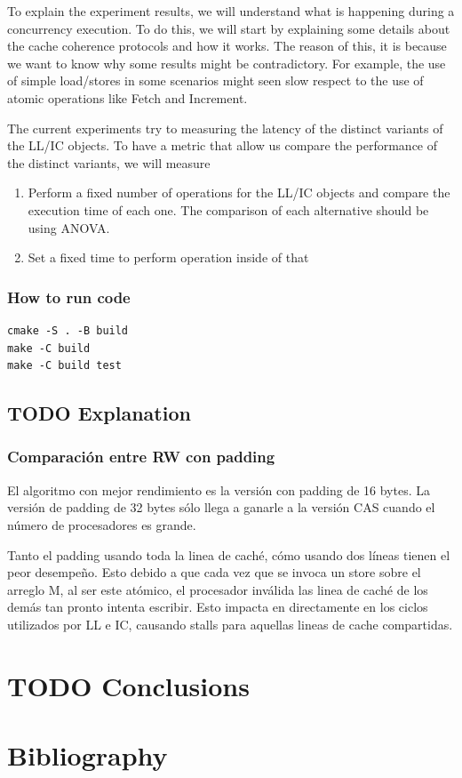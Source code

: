 \documentclass{latex/classes/thesis}
\begin{document}
To explain the experiment results, we
will understand what is happening during a concurrency execution. To do this,
we will start by explaining some details about the cache coherence protocols
and how it works. The reason of this, it is because we want to know why some
results might be contradictory. For example, the use of simple load/stores in
some scenarios might seen slow respect to the use of atomic operations like
Fetch and Increment.

The current experiments try to measuring the latency of the distinct variants
of the LL/IC objects. To have a metric that allow us compare the performance
of the distinct variants, we will measure

\begin{enumerate}
\item Perform a fixed number of operations for the LL/IC objects and compare the
execution time of each one. The comparison of each alternative should be
using ANOVA.
\item Set a fixed time to perform operation inside of that
\end{enumerate}

\subsection{How to run code}
\label{sec:orgf6ff6dd}

\lstset{language=bash,label= ,caption= ,captionpos=b,numbers=none}
\begin{lstlisting}
cmake -S . -B build
make -C build
make -C build test
\end{lstlisting}


\section{{\bfseries\sffamily TODO} Explanation}
\label{sec:org1cd319e}




\subsection{Comparación entre RW con padding}
\label{sec:orgeab0254}

El algoritmo con mejor rendimiento es la versión con padding de 16 bytes. La
versión de padding de 32 bytes sólo llega a ganarle a la versión CAS cuando
el número de procesadores es grande.

Tanto el padding usando toda la linea de caché, cómo usando dos líneas
tienen el peor desempeño. Esto debido a que cada vez que se invoca un store
sobre el arreglo M, al ser este atómico, el procesador inválida las linea de
caché de los demás tan pronto intenta escribir. Esto impacta en directamente
en los ciclos utilizados por LL e IC, causando stalls para aquellas lineas
de cache compartidas.



\chapter{{\bfseries\sffamily TODO} Conclusions}
\label{sec:orgc963d63}


\chapter{Bibliography}
\label{sec:orgbe572e7}


\end{document}
